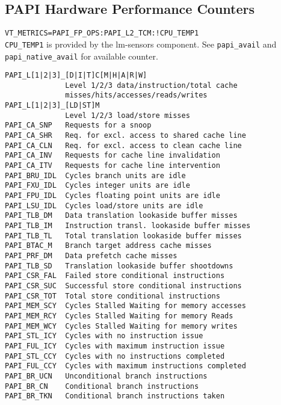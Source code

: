 \begin{multicols}{3}
\subsection*{PAPI Hardware Performance Counters}
\verb|VT_METRICS=PAPI_FP_OPS:PAPI_L2_TCM:!CPU_TEMP1|\\
\texttt{CPU\_TEMP1} is provided by the lm-sensors component. See \texttt{papi\_avail} and \texttt{papi\_native\_avail} for available counter.
\begin{scriptsize}
\begin{verbatim}
PAPI_L[1|2|3]_[D|I|T]C[M|H|A|R|W]    
              Level 1/2/3 data/instruction/total cache 
              misses/hits/accesses/reads/writes
PAPI_L[1|2|3]_[LD|ST]M    
              Level 1/2/3 load/store misses                       
PAPI_CA_SNP   Requests for a snoop                                
PAPI_CA_SHR   Req. for excl. access to shared cache line  
PAPI_CA_CLN   Req. for excl. access to clean cache line   
PAPI_CA_INV   Requests for cache line invalidation                
PAPI_CA_ITV   Requests for cache line intervention                
PAPI_BRU_IDL  Cycles branch units are idle                        
PAPI_FXU_IDL  Cycles integer units are idle                       
PAPI_FPU_IDL  Cycles floating point units are idle                
PAPI_LSU_IDL  Cycles load/store units are idle                    
PAPI_TLB_DM   Data translation lookaside buffer misses            
PAPI_TLB_IM   Instruction transl. lookaside buffer misses     
PAPI_TLB_TL   Total translation lookaside buffer misses           
PAPI_BTAC_M   Branch target address cache misses                  
PAPI_PRF_DM   Data prefetch cache misses                          
PAPI_TLB_SD   Translation lookaside buffer shootdowns             
PAPI_CSR_FAL  Failed store conditional instructions               
PAPI_CSR_SUC  Successful store conditional instructions           
PAPI_CSR_TOT  Total store conditional instructions                
PAPI_MEM_SCY  Cycles Stalled Waiting for memory accesses          
PAPI_MEM_RCY  Cycles Stalled Waiting for memory Reads             
PAPI_MEM_WCY  Cycles Stalled Waiting for memory writes            
PAPI_STL_ICY  Cycles with no instruction issue                    
PAPI_FUL_ICY  Cycles with maximum instruction issue               
PAPI_STL_CCY  Cycles with no instructions completed               
PAPI_FUL_CCY  Cycles with maximum instructions completed          
PAPI_BR_UCN   Unconditional branch instructions                   
PAPI_BR_CN    Conditional branch instructions                     
PAPI_BR_TKN   Conditional branch instructions taken               

\end{verbatim}
\end{scriptsize}
\end{multicols}
